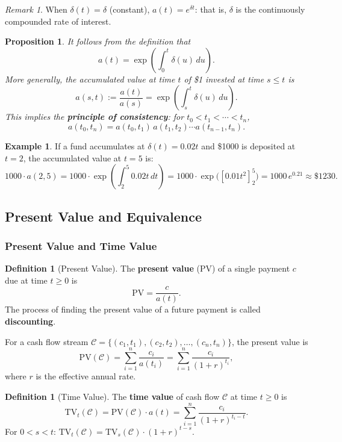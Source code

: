 \documentclass[12pt, a4paper]{article}
\theoremstyle{plain}
\newtheorem{proposition}[theorem]{Proposition}
\theoremstyle{definition}
\newtheorem{definition}[theorem]{Definition}
\newtheorem{example}[theorem]{Example}
\theoremstyle{remark}
\newtheorem{remark}[theorem]{Remark}
\begin{document}
\begin{remark}
  When $\delta(t) = \delta$ (constant), $a(t) = e^{\delta t}$: that is, $\delta$ is the continuously compounded rate of interest.
\end{remark}

\begin{proposition}
  It follows from the definition that
  \[
    a(t) = \exp\!\left(\int_0^t \delta(u)\,du\right).
  \]
  More generally, the accumulated value at time $t$ of \$1 invested at time $s \leq t$ is
  \[
    a(s, t) := \frac{a(t)}{a(s)} = \exp\!\left(\int_s^t \delta(u)\,du\right).
  \]
  This implies the \textbf{principle of consistency}: for $t_0 < t_1 < \cdots < t_n$,
  \[
    a(t_0, t_n) = a(t_0, t_1)\, a(t_1, t_2) \cdots a(t_{n-1}, t_n).
  \]
\end{proposition}

\begin{example}
  If a fund accumulates at $\delta(t) = 0.02t$ and \$1000 is deposited at $t=2$, the accumulated value at $t=5$ is:
  \[
    1000 \cdot a(2,5) = 1000 \cdot \exp\!\left(\int_2^5 0.02t\,dt\right) = 1000 \cdot \exp\!\bigl([0.01t^2]_2^5\bigr) = 1000\,e^{0.21} \approx \$1230.
  \]
\end{example}

\subsection{Present Value and Equivalence}

\subsubsection{Present Value and Time Value}

\begin{definition}[Present Value]
  The \textbf{present value} (PV) of a single payment $c$ due at time $t \geq 0$ is
  \[
    \mathrm{PV} = \frac{c}{a(t)}.
  \]
  The process of finding the present value of a future payment is called \textbf{discounting}.

  For a cash flow stream $\mathcal{C} = \{(c_1, t_1), (c_2, t_2), \ldots, (c_n, t_n)\}$, the present value is
  \[
    \mathrm{PV}(\mathcal{C}) = \sum_{i=1}^n \frac{c_i}{a(t_i)} = \sum_{i=1}^n \frac{c_i}{(1+r)^{t_i}},
  \]
  where $r$ is the effective annual rate.
\end{definition}

\begin{definition}[Time Value]
  The \textbf{time value} of cash flow $\mathcal{C}$ at time $t \geq 0$ is
  \[
    \mathrm{TV}_t(\mathcal{C}) = \mathrm{PV}(\mathcal{C}) \cdot a(t) = \sum_{i=1}^n \frac{c_i}{(1+r)^{t_i - t}}.
  \]
  For $0 < s < t$: $\mathrm{TV}_t(\mathcal{C}) = \mathrm{TV}_s(\mathcal{C}) \cdot (1+r)^{t-s}$.
\end{definition}
\end{document}

